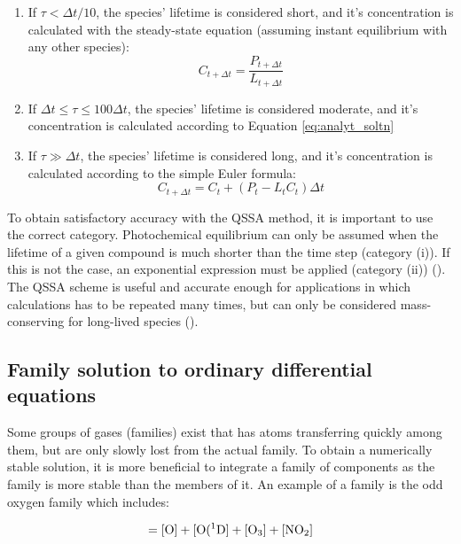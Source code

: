 \begin{enumerate}[label=(\roman*)]
    \item If $\tau < \Delta t/10$, the species' lifetime is considered short, and it's concentration is calculated with the steady-state equation (assuming instant equilibrium with any other species):
    \begin{equation}
        C_{t + \Delta t} = \frac{P_{t + \Delta t}}{L_{t + \Delta t}}
        \label{eq:a}
    \end{equation}
    \item If $\Delta t \leq \tau \leq 100\Delta t$, the species' lifetime is considered moderate, and it's concentration is calculated according to Equation \ref{eq:analyt_soltn}
    \item If $\tau \gg \Delta t$, the species' lifetime is considered long, and it's concentration is calculated according to the simple Euler formula: 
    \begin{equation}
        C_{t + \Delta t} = C_t + (P_t - L_tC_t)\Delta t
        \label{eq:b}
    \end{equation}
\end{enumerate}

To obtain satisfactory accuracy with the QSSA method, it is important to use the correct category. Photochemical equilibrium can only be assumed when the lifetime of a given compound is much shorter than the time step (category (i)). If this is not the case, an exponential expression must be applied (category (ii)) (\cite{Hesstvedt1978}). The QSSA scheme is useful and accurate enough for applications in which calculations has to be repeated many times, but can only  be considered mass-conserving for long-lived species (\cite{AtmModFund}). 

\subsection{Family solution to ordinary differential equations}\label{sec:families}

Some groups of gases (families) exist that has atoms transferring quickly among them, but are only slowly lost from the actual family. To obtain a numerically stable solution, it is more beneficial to integrate a family of components as the family is more stable than the members of it. An example of a family is the odd oxygen family which includes: 

\begin{equation*}
    [\chem{O_T}] = [\chem{O}] + [\chem{O(^1D}] + [\chem{O_3}] + [\chem{NO_2}]
\end{equation*}

